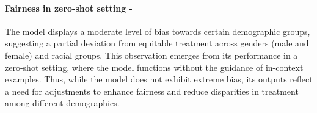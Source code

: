 \paragraph{Fairness in zero-shot setting - \mod}
The model displays a moderate level of bias towards certain demographic groups, suggesting a partial deviation from equitable treatment across genders (male and female) and racial groups. This observation emerges from its performance in a zero-shot setting, where the model functions without the guidance of in-context examples. Thus, while the model does not exhibit extreme bias, its outputs reflect a need for adjustments to enhance fairness and reduce disparities in treatment among different demographics.
